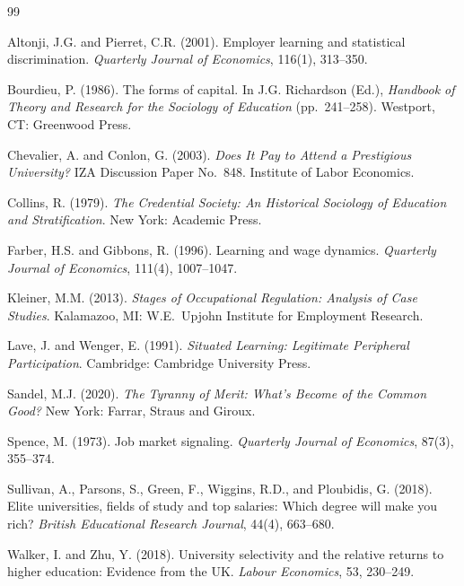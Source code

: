 \documentclass[11pt]{article}
\begin{document}
\begin{thebibliography}{99}

Altonji, J.G. and Pierret, C.R. (2001). Employer learning and statistical discrimination. \emph{Quarterly Journal of Economics}, 116(1), 313--350.

Bourdieu, P. (1986). The forms of capital. In J.G. Richardson (Ed.), \emph{Handbook of Theory and Research for the Sociology of Education} (pp.\ 241--258). Westport, CT: Greenwood Press.

Chevalier, A. and Conlon, G. (2003). \emph{Does It Pay to Attend a Prestigious University?} IZA Discussion Paper No.\ 848. Institute of Labor Economics.

Collins, R. (1979). \emph{The Credential Society: An Historical Sociology of Education and Stratification}. New York: Academic Press.

Farber, H.S. and Gibbons, R. (1996). Learning and wage dynamics. \emph{Quarterly Journal of Economics}, 111(4), 1007--1047.

Kleiner, M.M. (2013). \emph{Stages of Occupational Regulation: Analysis of Case Studies}. Kalamazoo, MI: W.E.\ Upjohn Institute for Employment Research.

Lave, J. and Wenger, E. (1991). \emph{Situated Learning: Legitimate Peripheral Participation}. Cambridge: Cambridge University Press.

Sandel, M.J. (2020). \emph{The Tyranny of Merit: What's Become of the Common Good?} New York: Farrar, Straus and Giroux.

Spence, M. (1973). Job market signaling. \emph{Quarterly Journal of Economics}, 87(3), 355--374.

Sullivan, A., Parsons, S., Green, F., Wiggins, R.D., and Ploubidis, G. (2018). Elite universities, fields of study and top salaries: Which degree will make you rich? \emph{British Educational Research Journal}, 44(4), 663--680.

Walker, I. and Zhu, Y. (2018). University selectivity and the relative returns to higher education: Evidence from the UK. \emph{Labour Economics}, 53, 230--249.

\end{thebibliography}
\end{document}
